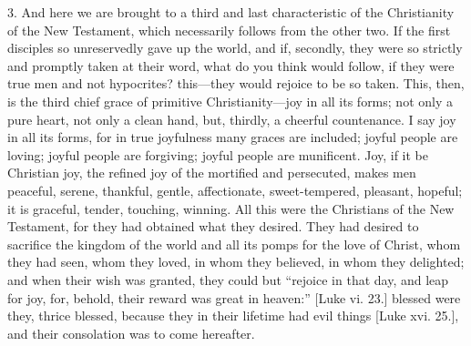 3. And here we are brought to a third and last characteristic of
the Christianity of the New Testament, which necessarily follows from
the other two. If the first disciples so unreservedly gave up the
world, and if, secondly, they were so strictly and promptly taken at
their word, what do you think would follow, if they were true men and
not hypocrites? this—they would rejoice to be so taken. This, then,
is the third chief grace of primitive Christianity—joy in all its
forms; not only a pure heart, not only a clean hand, but, thirdly, a
cheerful countenance. I say joy in all its forms, for in true
joyfulness many graces are included; joyful people are loving; joyful
people are forgiving; joyful people are munificent. Joy, if it be
Christian joy, the refined joy of the mortified and persecuted, makes
men peaceful, serene, thankful, gentle, affectionate, sweet-tempered,
pleasant, hopeful; it is graceful, tender, touching, winning. All this
were the Christians of the New Testament, for they had obtained what
they desired. They had desired to sacrifice the kingdom of the world
and all its pomps for the love of Christ, whom they had seen, whom
they loved, in whom they believed, in whom they delighted; and when
their wish was granted, they could but ``rejoice in that day, and
leap for joy, for, behold, their reward was great in heaven:''
[Luke vi. 23.] blessed were they, thrice blessed, because they in
their lifetime had evil things [Luke xvi. 25.], and their consolation
was to come hereafter.

